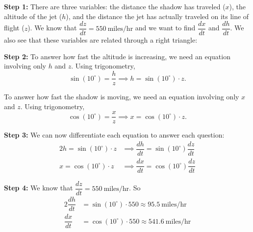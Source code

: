 \documentclass[14pt]{beamer}
\begin{document}
\begin{frame}
\small
{\bf Step 1:}  There are three variables:  the distance the shadow has traveled ($x$), the altitude of the jet ($h$), and the distance the jet has actually traveled on its line of flight ($z$).  We know that $\dfrac{dz}{dt}=550\ \text{miles/hr}$ and we want to find $\dfrac{dx}{dt}$ and $\dfrac{dh}{dt}$.  We also see that these variables are related through a right triangle:
\begin{center}
\end{center}
\end{frame}

\begin{frame}
\small
{\bf Step 2:}  To answer how fast the altitude is increasing, we need an equation involving only $h$ and $z$.  Using trigonometry,
\[\sin(10^{\circ})=\frac{h}{z} \implies h=\sin(10^{\circ}) \cdot z.\]

\vspace{1pc}
To answer how fast the shadow is moving, we need an equation involving only $x$ and $z$.  Using trigonometry,
\[\cos(10^{\circ})=\frac{x}{z} \implies x=\cos(10^{\circ}) \cdot z.\]
\end{frame}

\begin{frame}
\footnotesize
{\bf Step 3:}  We can now differentiate each equation to answer each question:
\begin{alignat*}{2}
h=\sin(10^{\circ}) \cdot z &\implies \dfrac{dh}{dt}=\sin(10^{\circ}) \dfrac{dz}{dt} \\
x=\cos(10^{\circ}) \cdot z &\implies \dfrac{dx}{dt}=\cos(10^{\circ}) \dfrac{dz}{dt}
\end{alignat*}

\vspace{1pc}
{\bf Step 4:}  We know that $\dfrac{dz}{dt}=550\ \text{miles/hr}$.  So 
\begin{alignat*}{2}
\dfrac{dh}{dt} &=\sin(10^{\circ}) \cdot 550 \approx 95.5\ \text{miles/hr}\\
\dfrac{dx}{dt} &=\cos(10^{\circ}) \cdot 550 \approx 541.6\ \text{miles/hr}
\end{alignat*}
\end{frame}
\end{document}
